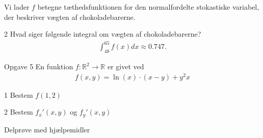 \documentclass[12pt,x11names,a4paper]{article}
\begin{document}
\begin{meretekst}
	Vi lader $f$ betegne tæthedsfunktionen for den normalfordelte stokastiske variabel, der beskriver vægten af chokoladebarerne. 
\end{meretekst}
\begin{delopgave}{}{2}
	Hvad siger følgende integral om vægten af chokoladebarerne?
	\begin{align*}
		\int_{48}^{65} f(x)dx \approx  0.747.
	\end{align*}
\end{delopgave}
\begin{opgavetekst}{Opgave 5}
	En funktion $f:\mathbb{R}^2 \to \mathbb{R}$ er givet ved
	\begin{align*}
		f(x,y) = \ln(x)\cdot(x-y) + y^2x
	\end{align*}
\end{opgavetekst}
\begin{delopgave}{}{1}
	Bestem $f(1,2)$
\end{delopgave}
\begin{delopgave}{}{2}
	Bestem $f_x'(x,y)$ og $f_y'(x,y)$
\end{delopgave}




\newpage
\begin{center}
\LARGE
Delprøve med hjælpemidler 
\end{center}
\end{document}
